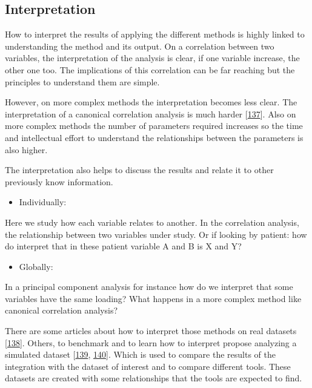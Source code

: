 \documentclass[
  12pt,
  a4paper,
  twoside,
  openright]{book}
\providecommand{\tightlist}{%
  \setlength{\itemsep}{0pt}\setlength{\parskip}{0pt}}
\begin{document}
\hypertarget{interpretation}{%
\subsection{Interpretation}\label{interpretation}}

How to interpret the results of applying the different methods is highly linked to understanding the method and its output.
On a correlation between two variables, the interpretation of the analysis is clear, if one variable increase, the other one too.
The implications of this correlation can be far reaching but the principles to understand them are simple.

However, on more complex methods the interpretation becomes less clear.
The interpretation of a canonical correlation analysis is much harder {[}\protect\hyperlink{ref-sherry2005}{137}{]}.
Also on more complex methods the number of parameters required increases so the time and intellectual effort to understand the relationships between the parameters is also higher.

The interpretation also helps to discuss the results and relate it to other previously know information.

\begin{itemize}
\tightlist
\item
  Individually:
\end{itemize}

Here we study how each variable relates to another.
In the correlation analysis, the relationship between two variables under study.
Or if looking by patient: how do interpret that in these patient variable A and B is X and Y?

\begin{itemize}
\tightlist
\item
  Globally:
\end{itemize}

In a principal component analysis for instance how do we interpret that some variables have the same loading?
What happens in a more complex method like canonical correlation analysis?

There are some articles about how to interpret those methods on real datasets {[}\protect\hyperlink{ref-sherryConductingInterpretingCanonical1981}{138}{]}.
Others, to benchmark and to learn how to interpret propose analyzing a simulated dataset {[}\protect\hyperlink{ref-chung_multi-omics_2019}{139}, \protect\hyperlink{ref-martuxednez-mira2018}{140}{]}.
Which is used to compare the results of the integration with the dataset of interest and to compare different tools.
These datasets are created with some relationships that the tools are expected to find.
\end{document}
